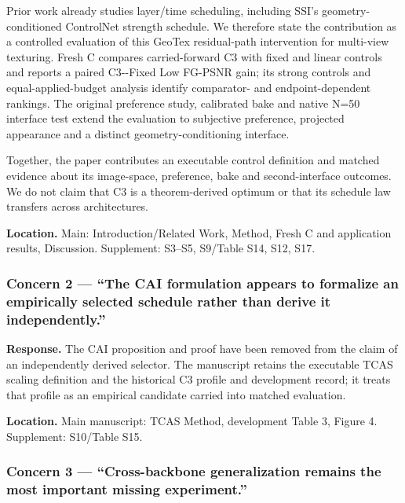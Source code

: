 \documentclass[
  10pt,
]{article}
\begin{document}
Prior work already studies layer/time scheduling, including SSI's geometry-conditioned ControlNet strength schedule. We therefore state the contribution as a controlled evaluation of this GeoTex residual-path intervention for multi-view texturing. Fresh C compares carried-forward C3 with fixed and linear controls and reports a paired C3-\/-Fixed Low FG-PSNR gain; its strong controls and equal-applied-budget analysis identify comparator- and endpoint-dependent rankings. The original preference study, calibrated bake and native N=50 interface test extend the evaluation to subjective preference, projected appearance and a distinct geometry-conditioning interface.

Together, the paper contributes an executable control definition and matched evidence about its image-space, preference, bake and second-interface outcomes. We do not claim that C3 is a theorem-derived optimum or that its schedule law transfers across architectures.

\textbf{Location.} Main: Introduction/Related Work, Method, Fresh C and application results, Discussion. Supplement: S3--S5, S9/Table S14, S12, S17.

\hypertarget{concern-2--the-cai-formulation-appears-to-formalize-an-empirically-selected-schedule-rather-than-derive-it-independently}{%
\subsubsection{Concern 2 --- ``The CAI formulation appears to formalize an empirically selected schedule rather than derive it independently.''}\label{concern-2--the-cai-formulation-appears-to-formalize-an-empirically-selected-schedule-rather-than-derive-it-independently}}

\textbf{Response.} The CAI proposition and proof have been removed from the claim of an independently derived selector. The manuscript retains the executable TCAS scaling definition and the historical C3 profile and development record; it treats that profile as an empirical candidate carried into matched evaluation.

\textbf{Location.} Main manuscript: TCAS Method, development Table 3, Figure 4. Supplement: S10/Table S15.

\hypertarget{concern-3--cross-backbone-generalization-remains-the-most-important-missing-experiment}{%
\subsubsection{Concern 3 --- ``Cross-backbone generalization remains the most important missing experiment.''}\label{concern-3--cross-backbone-generalization-remains-the-most-important-missing-experiment}}
\end{document}
